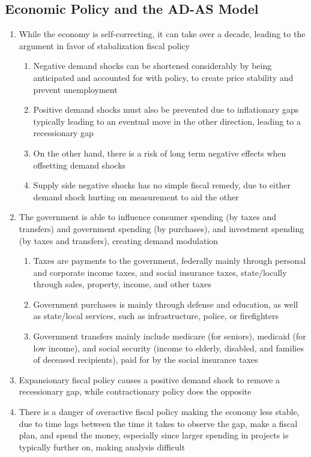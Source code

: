 \documentclass[11 pt, twoside]{article}
\begin{document}
\subsection{Economic Policy and the AD-AS Model}
\begin{enumerate}
\item While the economy is self-correcting, it can take over a decade, leading to the argument in favor of stabalization fiscal policy
\begin{enumerate}
\item Negative demand shocks can be shortened considerably by being anticipated and accounted for with policy, to create price stability and prevent unemployment
\item Positive demand shocks must also be prevented due to inflationary gaps typically leading to an eventual move in the other direction, leading to a recessionary gap
\item On the other hand, there is a risk of long term negative effects when offsetting demand shocks
\item Supply side negative shocks has no simple fiscal remedy, due to either demand shock hurting on measurement to aid the other
\end{enumerate}
\item The government is able to influence consumer spending (by taxes and transfers) and government spending (by purchases), and investment spending (by taxes and transfers), creating demand modulation
\begin{enumerate}
\item Taxes are payments to the government, federally mainly through personal and corporate income taxes, and social insurance taxes, state/locally through sales, property, income, and other taxes
\item Government purchases is mainly through defense and education, as well as state/local services, such as infrastructure, police, or firefighters
\item Government transfers mainly include medicare (for seniors), medicaid (for low income), and social security (income to elderly, disabled, and families of deceased recipients), paid for by the social insurance taxes
\end{enumerate}
\item Expansionary fiscal policy causes a positive demand shock to remove a recessionary gap, while contractionary policy does the opposite
\item There is a danger of overactive fiscal policy making the economy less stable, due to time lags between the time it takes to observe the gap, make a fiscal plan, and spend the money, especially since larger spending in projects is typically further on, making analysis difficult
\end{enumerate}
\end{document}
